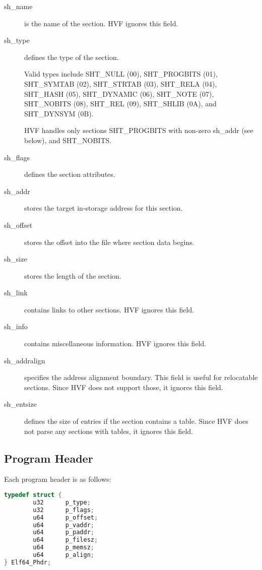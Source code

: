 \begin{description}
\item[sh\_name] is the name of the section.  HVF ignores this field.

\item[sh\_type] defines the type of the section.

	Valid types include SHT\_NULL (00), SHT\_PROGBITS (01), SHT\_SYMTAB
	(02), SHT\_STRTAB (03), SHT\_RELA (04), SHT\_HASH (05), SHT\_DYNAMIC
	(06), SHT\_NOTE (07), SHT\_NOBITS (08), SHT\_REL (09), SHT\_SHLIB
	(0A), and SHT\_DYNSYM (0B).

	HVF handles only sections SHT\_PROGBITS with non-zero sh\_addr (see
	below), and SHT\_NOBITS.

\item[sh\_flags] defines the section attributes.

\item[sh\_addr] stores the target in-storage address for this section.

\item[sh\_offset] stores the offset into the file where section data begins.

\item[sh\_size] stores the length of the section.

\item[sh\_link] contains links to other sections.  HVF ignores this field.

\item[sh\_info] contains miscellaneous information.  HVF ignores this field.

\item[sh\_addralign] specifies the address alignment boundary.  This field
	is useful for relocatable sections.  Since HVF does not support
	those, it ignores this field.

\item[sh\_entsize] defines the size of entries if the section contains a
	table.  Since HVF does not parse any sections with tables, it
	ignores this field.

\end{description}

\subsection{Program Header}
Each program header is as follows:

\begin{lstlisting}[language=C]
typedef struct {
        u32      p_type;
        u32      p_flags;
        u64      p_offset;
        u64      p_vaddr;
        u64      p_paddr;
        u64      p_filesz;
        u64      p_memsz;
        u64      p_align;
} Elf64_Phdr;
\end{lstlisting}

